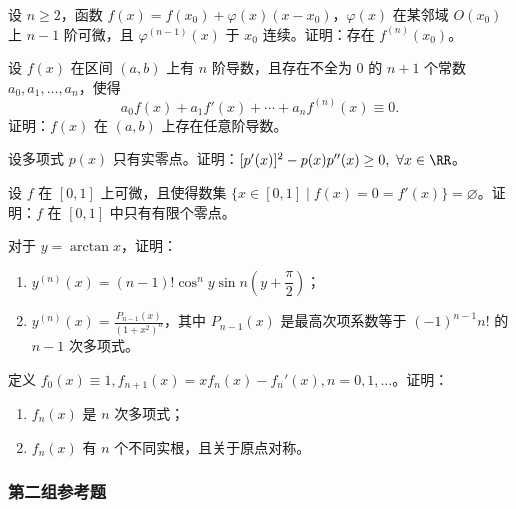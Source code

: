 \begin{xreferenceproblem}[15]
设 $n\ge2$，函数 $f(x)=f(x_0)+\varphi(x)(x-x_0)$，$\varphi(x)$ 在某邻域 $O(x_0)$ 上 $n-1$ 阶可微，且 $\varphi^{(n-1)}(x)$ 于 $x_0$ 连续。证明：存在 $f^{(n)}(x_0)$。
\end{xreferenceproblem}

\begin{xreferenceproblem}[16]
设 $f(x)$ 在区间 $(a,b)$ 上有 $n$ 阶导数，且存在不全为 0 的 $n+1$ 个常数 $a_0,a_1,\ldots,a_n$，使得
  \[
    a_0f(x)+a_1f'(x)+\cdots+a_nf^{(n)}(x)\equiv0.
  \]
  证明：$f(x)$ 在 $(a,b)$ 上存在任意阶导数。
\end{xreferenceproblem}

\begin{xreferenceproblem}[17]
设多项式 $p(x)$ 只有实零点。证明：$[p'(x)]^2-p(x)p''(x)\ge0,\ \forall x\in\RR$。
\end{xreferenceproblem}

\begin{xreferenceproblem}[18]
设 $f$ 在 $[0,1]$ 上可微，且使得数集 $\{x\in[0,1]\mid f(x)=0=f'(x)\}=\varnothing$。证明：$f$ 在 $[0,1]$ 中只有有限个零点。
\end{xreferenceproblem}

\begin{xreferenceproblem}[19]
对于 $y=\arctan x$，证明：
  \begin{enumerate}[label=(\arabic*)]
    \item $y^{(n)}(x)=(n-1)!\cos^n y\sin n\left(y+\dfrac\pi2\right)$；
    \item $\displaystyle y^{(n)}(x)=\frac{P_{n-1}(x)}{(1+x^2)^n}$，其中 $P_{n-1}(x)$ 是最高次项系数等于 $(-1)^{n-1}n!$ 的 $n-1$ 次多项式。
  \end{enumerate}
\end{xreferenceproblem}

\begin{xreferenceproblem}[20]
定义 $f_0(x)\equiv1,f_{n+1}(x)=xf_n(x)-f_n'(x),n=0,1,\ldots$。证明：
  \begin{enumerate}[label=(\arabic*)]
    \item $f_n(x)$ 是 $n$ 次多项式；
    \item $f_n(x)$ 有 $n$ 个不同实根，且关于原点对称。
  \end{enumerate}
\end{xreferenceproblem}

\subsubsection*{第二组参考题}


